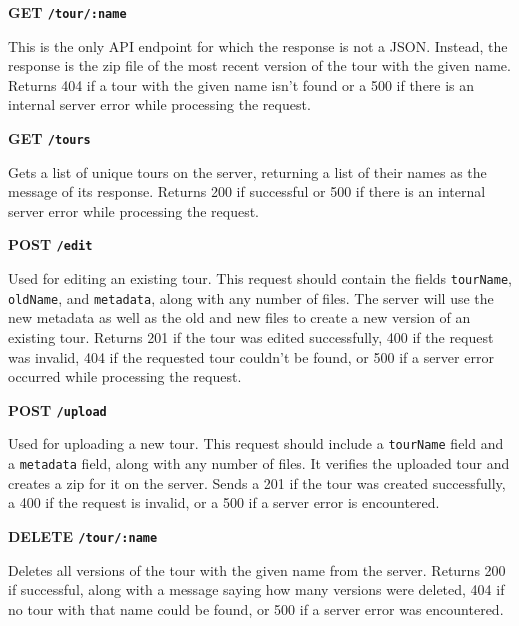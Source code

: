 \documentclass[a4paper, 10pt, american, titlepage]{article}
\newenvironment{indented}[1]%
{\begin{list}{}%
	{\setlength{\leftmargin}{#1}}%
	\item[]%
}
{\end{list}}
\begin{document}
\noindent\textbf{GET \texttt{/tour/:name}}

\begin{indented}{1cm}
	This is the only API endpoint for which the response is not a JSON. Instead,
	the response is the zip file of the most recent version of the tour with the
	given name. Returns 404 if a tour with the given name isn't found or a 500
	if there is an internal server error while processing the request.
\end{indented}

\noindent\textbf{GET \texttt{/tours}}

\begin{indented}{1cm}
	Gets a list of unique tours on the server, returning a list of their names
	as the message of its response. Returns 200 if successful or 500 if there is
	an internal server error while processing the request.
\end{indented}

\noindent\textbf{POST \texttt{/edit}}

\begin{indented}{1cm}
	Used for editing an existing tour. This request should contain the fields
	\texttt{tourName}, \texttt{oldName}, and \texttt{metadata}, along with any
	number of files.  The server will use the new metadata as well as the old
	and new files to create a new version of an existing tour. Returns 201 if
	the tour was edited successfully, 400 if the request was invalid, 404 if the
	requested tour couldn't be found, or 500 if a server error occurred while
	processing the request.
\end{indented}

\noindent\textbf{POST \texttt{/upload}}

\begin{indented}{1cm}
	Used for uploading a new tour. This request should include a
	\texttt{tourName} field and a \texttt{metadata} field, along with any number
	of files. It verifies the uploaded tour and creates a zip for it on the
	server. Sends a 201 if the tour was created successfully, a 400 if the
	request is invalid, or a 500 if a server error is encountered.
\end{indented}

\noindent\textbf{DELETE \texttt{/tour/:name}}

\begin{indented}{1cm}
	Deletes all versions of the tour with the given name from the server.
	Returns 200 if successful, along with a message saying how many versions
	were deleted, 404 if no tour with that name could be found, or 500 if a
	server error was encountered.
\end{indented}
\end{document}

